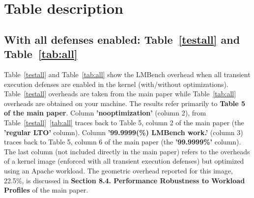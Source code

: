 \documentclass{article}
\begin{document}
\section{Table description}

\subsection{With all defenses enabled: Table~\ref{testall} and Table~\ref{tab:all}}
Table~\ref{testall} and Table~\ref{tab:all} show the LMBench overhead when all transient execution defenses are enabled
in the kernel (with/without optimizations). Table~\ref{testall} overheads are taken from the main paper while Table~\ref{tab:all}
overheads are obtained on your machine. The results refer primarily to \textbf{Table 5 of the main paper}.
Column \textbf{'nooptimization'} (column 2), from Table~\ref{testall}~\ref{tab:all} traces back to Table 5, column 2 of the main paper (the \textbf{'regular LTO'} column). 
Column \textbf{'99.9999(\%) LMBench work.'} (column 3) traces back to Table 5, column 6 of the main paper (the \textbf{'99.9999\%'} column). 
The last column (not included directly in the main paper) refers to the overheads of a kernel image (enforced with all transient execution defenses) 
but optimized using an Apache workload. The geometric overhead reported for this image, 22.5\%, 
is discussed in \textbf{Section 8.4. Performance Robustness to Workload Profiles} of the main paper.

\begin{table}[H]
\begin{center}
\begin{adjustbox}{width=0.5\textwidth}
\large

\end{adjustbox}
\end{center}
\label{testall} 
\end{table}
\begin{table}[H]
\begin{center}
\begin{adjustbox}{width=0.5\textwidth}
\large

\end{adjustbox}
\end{center}
\label{tab:all} 
\end{table}
\end{document}
